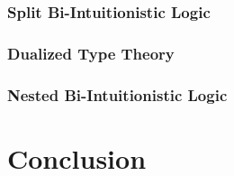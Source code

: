 \subsubsection{Split Bi-Intuitionistic Logic}
\label{subsec:split_bi-intuitionistic_logic}


\subsubsection{Dualized Type Theory}
\label{subsubsec:dualized_type_theory}


\subsubsection{Nested Bi-Intuitionistic Logic}
\label{subsec:nested_bi-intuitionistic_logic}



 
\section{Conclusion}
\label{sec:conclusion}


 

